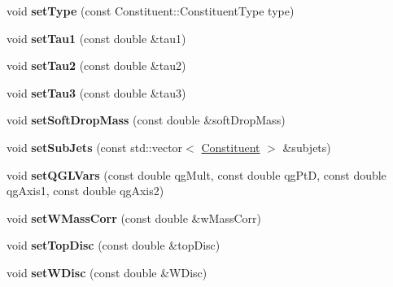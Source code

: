 \begin{DoxyCompactItemize}
\item 
\hypertarget{classConstituent_a18e4436af7fa3eb2a45e98b1917d5334}{void {\bfseries set\-Type} (const Constituent\-::\-Constituent\-Type type)}\label{classConstituent_a18e4436af7fa3eb2a45e98b1917d5334}

\item 
\hypertarget{classConstituent_a9d1493cc1e27c929833f5d98b73ddd88}{void {\bfseries set\-Tau1} (const double \&tau1)}\label{classConstituent_a9d1493cc1e27c929833f5d98b73ddd88}

\item 
\hypertarget{classConstituent_ae090779940f2716959ece7eacd94030d}{void {\bfseries set\-Tau2} (const double \&tau2)}\label{classConstituent_ae090779940f2716959ece7eacd94030d}

\item 
\hypertarget{classConstituent_a3e08a3c5233f6cb754404e73e25b1a8c}{void {\bfseries set\-Tau3} (const double \&tau3)}\label{classConstituent_a3e08a3c5233f6cb754404e73e25b1a8c}

\item 
\hypertarget{classConstituent_abacfdb87d076479f5a5dab8147ca2bb3}{void {\bfseries set\-Soft\-Drop\-Mass} (const double \&soft\-Drop\-Mass)}\label{classConstituent_abacfdb87d076479f5a5dab8147ca2bb3}

\item 
\hypertarget{classConstituent_a80a81bb60ea3ed312e058e46b53ff791}{void {\bfseries set\-Sub\-Jets} (const std\-::vector$<$ \hyperlink{classConstituent}{Constituent} $>$ \&subjets)}\label{classConstituent_a80a81bb60ea3ed312e058e46b53ff791}

\item 
\hypertarget{classConstituent_a934831e1872c7ac6f1e777d3069ee55a}{void {\bfseries set\-Q\-G\-L\-Vars} (const double qg\-Mult, const double qg\-Pt\-D, const double qg\-Axis1, const double qg\-Axis2)}\label{classConstituent_a934831e1872c7ac6f1e777d3069ee55a}

\item 
\hypertarget{classConstituent_ac8ce2c1a6eb317adc0d371f5ef49c726}{void {\bfseries set\-W\-Mass\-Corr} (const double \&w\-Mass\-Corr)}\label{classConstituent_ac8ce2c1a6eb317adc0d371f5ef49c726}

\item 
\hypertarget{classConstituent_a61c3073e6ed0f3d5c93c9d8289453cb9}{void {\bfseries set\-Top\-Disc} (const double \&top\-Disc)}\label{classConstituent_a61c3073e6ed0f3d5c93c9d8289453cb9}

\item 
\hypertarget{classConstituent_a48d0d129c41154c3dcaa51ff3e5c44c3}{void {\bfseries set\-W\-Disc} (const double \&W\-Disc)}\label{classConstituent_a48d0d129c41154c3dcaa51ff3e5c44c3}


\end{DoxyCompactItemize}
